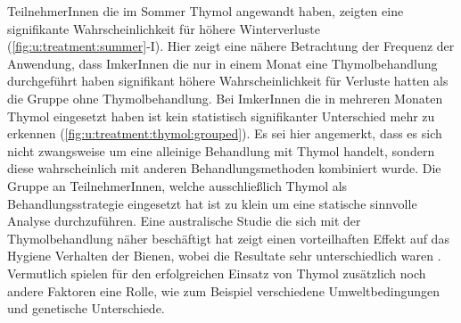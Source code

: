 TeilnehmerInnen die im Sommer Thymol angewandt haben, zeigten eine signifikante Wahrscheinlichkeit für höhere Winterverluste (\cref{fig:u:treatment:summer}-I). Hier zeigt eine nähere Betrachtung der Frequenz der Anwendung, dass ImkerInnen die nur in einem Monat eine Thymolbehandlung durchgeführt haben signifikant höhere Wahrscheinlichkeit für Verluste hatten als die Gruppe ohne Thymolbehandlung. Bei ImkerInnen die in mehreren Monaten Thymol eingesetzt haben ist kein statistisch signifikanter Unterschied mehr zu erkennen (\cref{fig:u:treatment:thymol:grouped}). Es sei hier angemerkt, dass es sich nicht zwangsweise um eine alleinige Behandlung mit Thymol handelt, sondern diese wahrscheinlich mit anderen Behandlungsmethoden kombiniert wurde. Die Gruppe an TeilnehmerInnen, welche ausschließlich Thymol als Behandlungsstrategie eingesetzt hat ist zu klein um eine statische sinnvolle Analyse durchzuführen.
\newline
Eine australische Studie die sich mit der Thymolbehandlung näher beschäftigt hat  zeigt einen vorteilhaften Effekt auf das Hygiene Verhalten der Bienen, wobei die Resultate sehr unterschiedlich waren  \citep{colin2019}. Vermutlich spielen für den erfolgreichen Einsatz von Thymol zusätzlich noch andere Faktoren eine Rolle, wie zum Beispiel verschiedene Umweltbedingungen und genetische Unterschiede.


